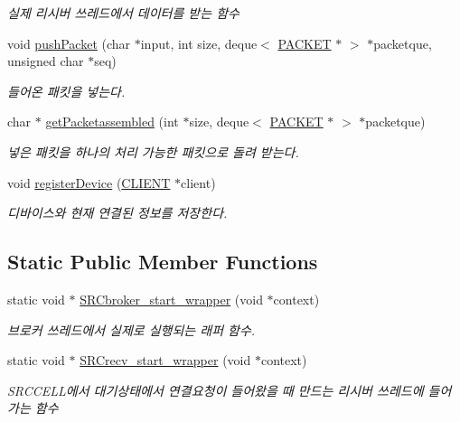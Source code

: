 \begin{DoxyCompactItemize}
\begin{DoxyCompactList}\small\item\em 실제 리시버 쓰레드에서 데이터를 받는 함수 \end{DoxyCompactList}\item 
void \hyperlink{classSRCCELL_a098c577b87319d7f5adb914e6567c7e9}{push\+Packet} (char $\ast$input, int size, deque$<$ \hyperlink{classPACKET}{P\+A\+C\+K\+E\+T} $\ast$ $>$ $\ast$packetque, unsigned char $\ast$seq)
\begin{DoxyCompactList}\small\item\em 들어온 패킷을 넣는다. \end{DoxyCompactList}\item 
char $\ast$ \hyperlink{classSRCCELL_a8e3afdc9b6c09200cd78225ded9425c0}{get\+Packetassembled} (int $\ast$size, deque$<$ \hyperlink{classPACKET}{P\+A\+C\+K\+E\+T} $\ast$ $>$ $\ast$packetque)
\begin{DoxyCompactList}\small\item\em 넣은 패킷을 하나의 처리 가능한 패킷으로 돌려 받는다. \end{DoxyCompactList}\item 
void \hyperlink{classSRCCELL_a0b41dd4b175c06ce862c4fc3d5ba10a2}{register\+Device} (\hyperlink{structCLIENT}{C\+L\+I\+E\+N\+T} $\ast$client)
\begin{DoxyCompactList}\small\item\em 디바이스와 현재 연결된 정보를 저장한다. \end{DoxyCompactList}\end{DoxyCompactItemize}
\subsection*{Static Public Member Functions}
\begin{DoxyCompactItemize}
\item 
static void $\ast$ \hyperlink{classSRCCELL_a2be96e34bed6a9186ec85772febdd50b}{S\+R\+Cbroker\+\_\+start\+\_\+wrapper} (void $\ast$context)
\begin{DoxyCompactList}\small\item\em 브로커 쓰레드에서 실제로 실행되는 래퍼 함수. \end{DoxyCompactList}\item 
static void $\ast$ \hyperlink{classSRCCELL_a7957253a55cddb0c37d3db9c39077387}{S\+R\+Crecv\+\_\+start\+\_\+wrapper} (void $\ast$context)
\begin{DoxyCompactList}\small\item\em S\+R\+C\+C\+E\+L\+L에서 대기상태에서 연결요청이 들어왔을 때 만드는 리시버 쓰레드에 들어가는 함수 \end{DoxyCompactList}\end{DoxyCompactItemize}
